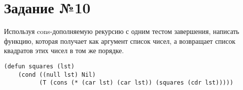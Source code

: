 \section{Задание №10}

Используя cons-дополняемую рекурсию с одним тестом завершения, написать функцию,
которая получает как аргумент список чисел, а возвращает список квадратов этих
чисел в том же порядке.

\vspace{4mm}
\begin{minipage}{0.92\linewidth}
\begin{lstlisting}
(defun squares (lst)
    (cond ((null lst) Nil)
          (T (cons (* (car lst) (car lst)) (squares (cdr lst)))))
\end{lstlisting}
\end{minipage}

